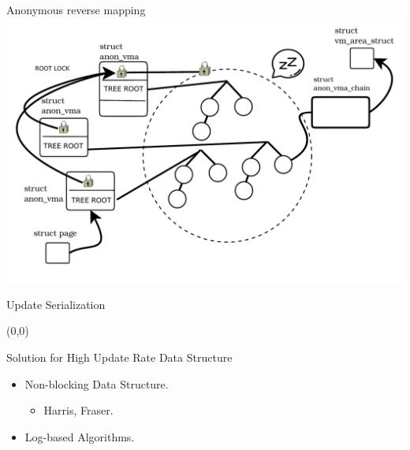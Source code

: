 \documentclass[english]{beamer} %
\begin{document}
\begin{frame}{Anonymous reverse mapping}
\includegraphics[scale=0.5]{fig/anon_vma_default_1}
\end{frame}


\begin{frame}{Update Serialization}
\begin{textblock}{1}(0,0)
\end{textblock}
\end{frame}

\begin{frame}{Solution for High Update Rate Data Structure}
    \begin{itemize}[<+-| alert@+>]
    \item Non-blocking Data Structure.
    \begin{itemize}
        \item Harris, Fraser.
    \end{itemize}
    \item Log-based Algorithms. 
    \end{itemize}
\end{frame}
\end{document}
